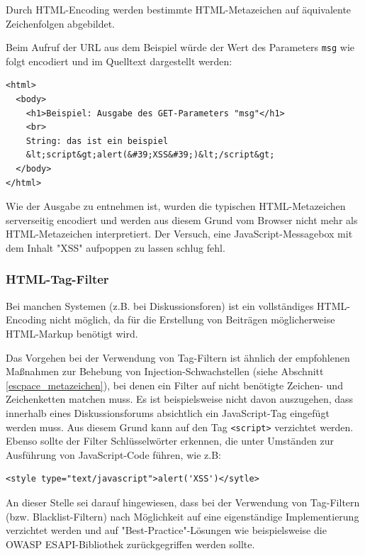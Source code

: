 Durch HTML-Encoding \cite{character_encoding}
werden bestimmte HTML-Metazeichen auf äquivalente Zeichenfolgen abgebildet.

Beim Aufruf der URL aus dem Beispiel würde der Wert des Parameters 
\texttt{msg} wie folgt encodiert und im Quelltext dargestellt werden:

\begin{lstlisting}[basicstyle=\ttfamily\footnotesize]
<html>
  <body>
    <h1>Beispiel: Ausgabe des GET-Parameters "msg"</h1>
    <br>
    String: das ist ein beispiel
    &lt;script&gt;alert(&#39;XSS&#39;)&lt;/script&gt;
  </body>
</html>
\end{lstlisting}

Wie der Ausgabe zu entnehmen ist, wurden die typischen HTML-Metazeichen 
serverseitig encodiert und werden aus diesem Grund vom Browser nicht 
mehr als HTML-Metazeichen interpretiert. Der Versuch, eine JavaScript-Messagebox 
mit dem Inhalt "XSS" aufpoppen zu lassen schlug fehl.

\subsubsection{HTML-Tag-Filter}

Bei manchen Systemen (z.B. bei Diskussionsforen) ist ein vollständiges 
HTML-Encoding nicht möglich, da für die Erstellung von Beiträgen 
möglicherweise HTML-Markup benötigt wird. 

Das Vorgehen bei der Verwendung von Tag-Filtern ist ähnlich der 
empfohlenen Maßnahmen zur Behebung von Injection-Schwachstellen 
(siehe Abschnitt \ref{escpace_metazeichen}), bei denen ein Filter auf 
nicht benötigte Zeichen- und Zeichenketten matchen muss. Es ist 
beispielsweise nicht davon auszugehen, dass innerhalb eines 
Diskussionsforums absichtlich ein JavaScript-Tag eingefügt werden 
muss. Aus diesem Grund kann auf den Tag \texttt{<script>} verzichtet 
werden. Ebenso sollte der Filter Schlüsselwörter erkennen, die unter 
Umständen zur Ausführung von JavaScript-Code führen, wie z.B:

\begin{lstlisting}[basicstyle=\ttfamily\footnotesize]
<style type="text/javascript">alert('XSS')</sytle>
\end{lstlisting}

An dieser Stelle sei darauf hingewiesen, dass bei der Verwendung von 
Tag-Filtern (bzw. Blacklist-Filtern) nach Möglichkeit auf eine 
eigenständige Implementierung verzichtet werden und auf 
"Best-Practice"-Lösungen wie beispielsweise die OWASP 
ESAPI-Bibliothek zurückgegriffen werden sollte.

